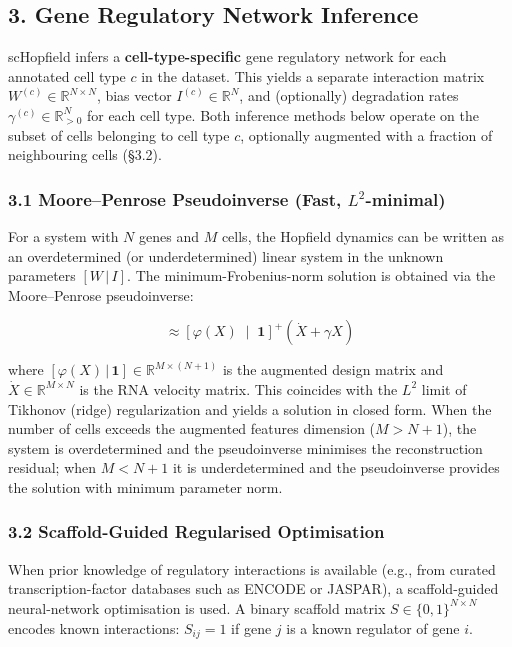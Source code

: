 \documentclass[11pt]{article}
\begin{document}
\subsection*{3. Gene Regulatory Network Inference}

scHopfield infers a \textbf{cell-type-specific} gene regulatory network for each annotated cell type $c$ in the dataset. This yields a separate interaction matrix $W^{(c)} \in \mathbb{R}^{N \times N}$, bias vector $I^{(c)} \in \mathbb{R}^N$, and (optionally) degradation rates $\gamma^{(c)} \in \mathbb{R}^N_{>0}$ for each cell type. Both inference methods below operate on the subset of cells belonging to cell type $c$, optionally augmented with a fraction of neighbouring cells (§3.2).


\subsubsection*{3.1 Moore--Penrose Pseudoinverse (Fast, $L^2$-minimal)}

For a system with $N$ genes and $M$ cells, the Hopfield dynamics can be written as an overdetermined (or underdetermined) linear system in the unknown parameters $[W \,|\, I]$. The minimum-Frobenius-norm solution is obtained via the Moore--Penrose pseudoinverse:


\begin{equation}
[W \;|\; I] \approx \left[\varphi(X) \;\middle|\; \mathbf{1}\right]^{+} \left(\dot{X} + \gamma X\right) 
\end{equation}


where $[\varphi(X) \,|\, \mathbf{1}] \in \mathbb{R}^{M \times (N+1)}$ is the augmented design matrix and $\dot{X} \in \mathbb{R}^{M \times N}$ is the RNA velocity matrix. This coincides with the $L^2$ limit of Tikhonov (ridge) regularization and yields a solution in closed form. When the number of cells exceeds the augmented features dimension ($M > N+1$), the system is overdetermined and the pseudoinverse minimises the reconstruction residual; when $M < N+1$ it is underdetermined and the pseudoinverse provides the solution with minimum parameter norm.


\subsubsection*{3.2 Scaffold-Guided Regularised Optimisation}

When prior knowledge of regulatory interactions is available (e.g., from curated transcription-factor databases such as ENCODE or JASPAR), a scaffold-guided neural-network optimisation is used. A binary scaffold matrix $S \in \{0,1\}^{N \times N}$ encodes known interactions: $S_{ij} = 1$ if gene $j$ is a known regulator of gene $i$.
\end{document}
